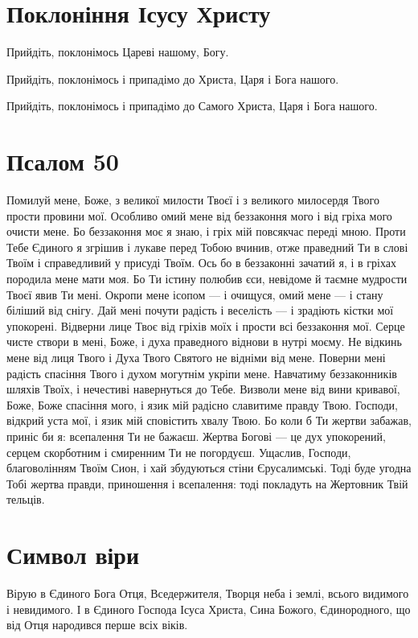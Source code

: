 \documentclass[chapters.tex]{subfiles}
\begin{document}
\section{Поклоніння Ісусу Христу}
Прийдіть, поклонімось Цареві нашому, Богу.

Прийдіть, поклонімось і припадімо до Христа, Царя і Бога нашого.

Прийдіть, поклонімось і припадімо до Самого Христа, Царя і Бога нашого.

\section{Псалом 50}
Помилуй мене, Боже, з великої милости Твоєї і з великого милосердя Твого прости провини мої. Особливо омий мене від беззаконня мого і від гріха мого очисти мене. Бо беззаконня моє я знаю, і гріх мій повсякчас переді мною. Проти Тебе Єдиного я згрішив і лукаве перед Тобою вчинив, отже праведний Ти в слові Твоїм і справедливий у присуді Твоїм. Ось бо в беззаконні зачатий я, і в гріхах породила мене мати моя. Бо Ти істину полюбив єси, невідоме й таємне мудрости Твоєї явив Ти мені. Окропи мене ісопом — і очищуся, омий мене — і стану біліший від снігу. Дай мені почути радість і веселість — і зрадіють кістки мої упокорені. Відверни лице Твоє від гріхів моїх і прости всі беззаконня мої. Серце чисте створи в мені, Боже, і духа праведного віднови в нутрі моєму. Не відкинь мене від лиця Твого і Духа Твого Святого не відніми від мене. Поверни мені радість спасіння Твого і духом могутнім укріпи мене. Навчатиму беззаконників шляхів Твоїх, і нечестиві навернуться до Тебе. Визволи мене від вини кривавої, Боже, Боже спасіння мого, і язик мій радісно славитиме правду Твою. Господи, відкрий уста мої, і язик мій сповістить хвалу Твою. Бо коли б Ти жертви забажав, приніс би я: всепалення Ти не бажаєш. Жертва Богові — це дух упокорений, серцем скорботним і смиренним Ти не погордуєш. Ущаслив, Господи, благоволінням Твоїм Сион, і хай збудуються стіни Єрусалимські. Тоді буде угодна Тобі жертва правди, приношення і всепалення: тоді покладуть на Жертовник Твій тельців.

\section{Символ віри}
Вірую в Єдиного Бога Отця, Вседержителя, Творця неба і землі, всього видимого і невидимого. І в Єдиного Господа Ісуса Христа, Сина Божого, Єдинородного, що від Отця народився перше всіх віків.
\end{document}
